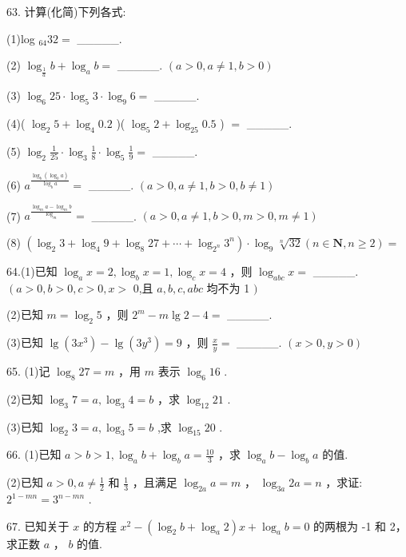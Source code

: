 \documentclass[10pt]{article}
\begin{document}
63. 计算(化简)下列各式:

(1)log \({}_{64}{32} =\) \_\_\_\_\_.

(2) \({\log }_{\frac{1}{a}}b + {\log }_{a}b =\) \_\_\_\_\_. \(\left( {a > 0,a \neq  1,b > 0}\right)\)

(3) \({\log }_{6}{25} \cdot  {\log }_{5}3 \cdot  {\log }_{9}6 =\) \_\_\_\_\_.

(4)( \({\log }_{2}5 + {\log }_{4}{0.2}\) )( \({\log }_{5}2 + {\log }_{25}{0.5}\) ) \(=\) \_\_\_\_\_.

(5) \({\log }_{2}\frac{1}{25} \cdot  {\log }_{3}\frac{1}{8} \cdot  {\log }_{5}\frac{1}{9} =\) \_\_\_\_\_.

(6) \({a}^{\frac{{\log }_{b}\left( {{\log }_{b}a}\right) }{{\log }_{b}a}} =\) \_\_\_\_\_. \(\left( {a > 0,a \neq  1,b > 0,b \neq  1}\right)\)

(7) \({a}^{\frac{{\log }_{m}a - {\log }_{m}b}{{\log }_{m}}} =\) \_\_\_\_\_. \(\left( {a > 0,a \neq  1,b > 0,m > 0,m \neq  1}\right)\)

(8) \(\left( {{\log }_{2}3 + {\log }_{4}9 + {\log }_{8}{27} + \cdots  + {\log }_{{2}^{n}}{3}^{n}}\right)  \cdot  {\log }_{9}\sqrt[n]{32}\left( {n \in  \mathbf{N},n \geq  2}\right)  =\)

64.(1)已知 \({\log }_{a}x = 2,{\log }_{b}x = 1,{\log }_{c}x = 4\) ，则 \({\log }_{abc}x =\) \_\_\_\_\_. \(\left( {a > 0,b > 0,c > 0,x > }\right.\) 0,且 \(a,b,c,{abc}\) 均不为 1 \()\)

(2)已知 \(m = {\log }_{2}5\) ，则 \({2}^{m} - m\lg 2 - 4 =\) \_\_\_\_\_.

(3)已知 \(\lg \left( {3{x}^{3}}\right)  - \lg \left( {3{y}^{3}}\right)  = 9\) ，则 \(\frac{x}{y} =\) \_\_\_\_\_. \(\left( {x > 0,y > 0}\right)\)

65. (1)记 \({\log }_{8}{27} = m\) ，用 \(m\) 表示 \({\log }_{6}{16}\) .

(2)已知 \({\log }_{3}7 = a,{\log }_{3}4 = b\) ，求 \({\log }_{12}{21}\) .

(3)已知 \({\log }_{2}3 = a,{\log }_{3}5 = b\) ,求 \({\log }_{15}{20}\) .

66. (1)已知 \(a > b > 1,{\log }_{a}b + {\log }_{b}a = \frac{10}{3}\) ，求 \({\log }_{a}b - {\log }_{b}a\) 的值.

(2)已知 \(a > 0,a \neq  \frac{1}{2}\) 和 \(\frac{1}{3}\) ，且满足 \({\log }_{2a}a = m\) ， \({\log }_{3a}{2a} = n\) ，求证: \({2}^{1 - {mn}} = {3}^{n - {mn}}\) .

67. 已知关于 \(x\) 的方程 \({x}^{2} - \left( {{\log }_{2}b + {\log }_{a}2}\right) x + {\log }_{a}b = 0\) 的两根为 -1 和 2，求正数 \(a\) ， \(b\) 的值.
\end{document}
